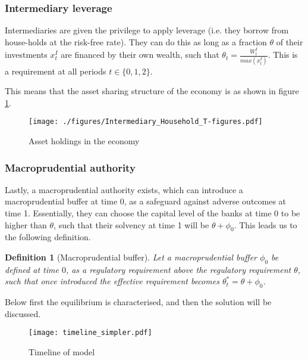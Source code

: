 \documentclass[11pt]{article}
\newtheorem{definition}{Definition}%
\begin{document}
\subsubsection*{Intermediary leverage}
Intermediaries are given the privilege to apply leverage (i.e. they borrow from house-holds at the risk-free rate). They can do this as long as a fraction $\theta$ of their investments $x^I_t$ are financed by their own wealth, such that $\theta_t = \frac{W^I_t}{max(x^{I}_t)}$. This is a requirement at all periods $t\in \{0,1,2\}$. 

This means that the asset sharing structure of the economy is as shown in figure \ref{fig:t-figure}.
\begin{figure}[h]
\centering
\texttt{[image: ./figures/Intermediary\_Household\_T-figures.pdf]}
\caption{Asset holdings in the economy\\
}
\label{fig:t-figure}
\end{figure}

\subsubsection*{Macroprudential authority}
Lastly, a macroprudential authority exists, which can introduce a macroprudential buffer at time 0, as a safeguard against adverse outcomes at time 1. Essentially, they can choose the capital level of the banks at time 0 to be higher than $\theta$, such that their solvency at time 1 will be $\theta + \phi_0$. This leads us to the following definition.


\begin{definition}[Macroprudential buffer]
Let a macroprudential buffer $\phi_0$ be defined at time $0$, as a regulatory requirement above the regulatory requirement $\theta$, such that once introduced the effective requirement becomes $\theta^*_t = \theta + \phi_0$.
\end{definition}


Below first the equilibrium is characterised, and then the solution will be discussed.

\begin{figure}[h]
\centering
\texttt{[image: timeline\_simpler.pdf]}
\caption{Timeline of model\\
}
\label{fig:timeline}
\end{figure}
\end{document}
